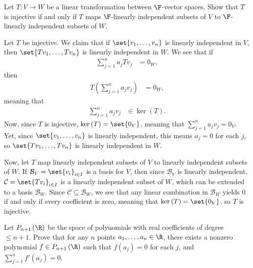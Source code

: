 \documentclass[10pt]{mypackage}
\begin{document}
\RaggedRight
\begin{problem}[Problem 1]
  Let $T\colon V\rightarrow W$ be a linear transformation between $\F$-vector spaces. Show that $T$ is injective if and only if $T$ maps $\F$-linearly independent subsets of $V$ to $\F$-linearly independent subsets of $W$.
\end{problem}
\begin{solution}
  Let $T$ be injective. We claim that if $\set{v_1,\dots,v_n}$ is linearly independent in $V$, then $\set{Tv_1,\dots,Tv_n}$ is linearly independent in $W$. We see that if
  \begin{align*}
    \sum_{j=1}^{n}a_jTv_j &= 0_{W},
  \end{align*}
  then
  \begin{align*}
    T\left( \sum_{j=1}^{n}a_jv_j \right) &= 0_W,
  \end{align*}
  meaning that
  \begin{align*}
    \sum_{j=1}^{n}a_jv_j &\in \ker\left( T \right).
  \end{align*}
  Now, since $T$ is injective, $\ker\left( T \right) = \set{0_V}$, meaning that $\sum_{j=1}^{n}a_jv_j = 0_V$. Yet, since $\set{v_1,\dots,v_n}$ is linearly independent, this means $a_j = 0$ for each $j$, so $\set{Tv_1,\dots,Tv_n}$ is linearly independent in $W$.\newline

  Now, let $T$ map linearly independent subsets of $V$ to linearly independent subsets of $W$. If $\mathcal{B}_V = \set{v_i}_{i\in I}$ is a basis for $V$, then since $\mathcal{B}_V$ is linearly independent, $\mathcal{C} = \set{Tv_i}_{i\in I}$ is a linearly independent subset of $W$, which can be extended to a basis $\mathcal{B}_W$. Since $\mathcal{C}\subseteq \mathcal{B}_W$, we see that any linear combination in $\mathcal{B}_W$ yields $0$ if and only if every coefficient is zero, meaning that $\ker\left( T \right) = \set{0_V}$, so $T$ is injective.
\end{solution}
\begin{problem}[Problem 2]
  Let $P_{n+1}\left( \R \right)$ be the space of polynomials with real coefficients of degree $\leq n+1$. Prove that for any $n$ points $a_1,\dots,a_n\in \R$, there exists a nonzero polynomial $f\in P_{n+1}\left( \R \right)$ such that $f\left( a_j \right) = 0$ for each $j$, and $\sum_{j=1}^{n}f'\left(a_j\right) = 0$.
\end{problem}
\end{document}

